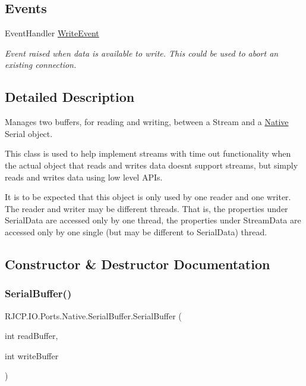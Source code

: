 \subsection*{Events}
\begin{DoxyCompactItemize}
\item 
Event\+Handler \mbox{\hyperlink{class_r_j_c_p_1_1_i_o_1_1_ports_1_1_native_1_1_serial_buffer_a579db9204c3b8737905631ee30dd7d14}{Write\+Event}}
\begin{DoxyCompactList}\small\item\em Event raised when data is available to write. This could be used to abort an existing connection. \end{DoxyCompactList}\end{DoxyCompactItemize}


\subsection{Detailed Description}
Manages two buffers, for reading and writing, between a Stream and a \mbox{\hyperlink{namespace_r_j_c_p_1_1_i_o_1_1_ports_1_1_native}{Native}} Serial object. 

This class is used to help implement streams with time out functionality when the actual object that reads and writes data doesn\textquotesingle{}t support streams, but simply reads and writes data using low level A\+P\+Is. 

It is to be expected that this object is only used by one reader and one writer. The reader and writer may be different threads. That is, the properties under Serial\+Data are accessed only by one thread, the properties under Stream\+Data are accessed only by one single (but may be different to Serial\+Data) thread.

\subsection{Constructor \& Destructor Documentation}
\mbox{\label{class_r_j_c_p_1_1_i_o_1_1_ports_1_1_native_1_1_serial_buffer_aace64e48316ea242d364e9fba722f11e}} 
\subsubsection{\texorpdfstring{SerialBuffer()}{SerialBuffer()}\hspace{0.1cm}{\footnotesize\ttfamily [1/2]}}
{\footnotesize\ttfamily R\+J\+C\+P.\+I\+O.\+Ports.\+Native.\+Serial\+Buffer.\+Serial\+Buffer (\begin{DoxyParamCaption}\item[{int}]{read\+Buffer,  }\item[{int}]{write\+Buffer }\end{DoxyParamCaption})}



